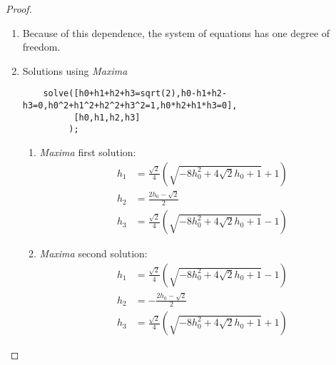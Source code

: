 \begin{proof}
\begin{enumerate}
\begin{enumerate}
\item Because of this dependence, the system of equations has one degree of freedom.

\item Solutions using {\em Maxima}\texttrademark \\
  \begin{verbatim}
    solve([h0+h1+h2+h3=sqrt(2),h0-h1+h2-h3=0,h0^2+h1^2+h2^2+h3^2=1,h0*h2+h1*h3=0],
          [h0,h1,h2,h3]
         );
  \end{verbatim}
\begin{enumerate}
\item {\em Maxima} first solution:
  \begin{align*}
    h_1 &= \frac{\sqrt{2}}{4}\left(\sqrt{-8h_0^2+4\sqrt{2}h_0+1}+1\right)
  \\h_2 &= \frac{2h_0-\sqrt{2}}{2}
  \\h_3 &= \frac{\sqrt{2}}{4}\left(\sqrt{-8h_0^2+4\sqrt{2}h_0+1}-1\right)
  \end{align*}

\item {\em Maxima} second solution:
  \begin{align*}
    h_1 &= \frac{\sqrt{2}}{4}\left(\sqrt{-8h_0^2+4\sqrt{2}h_0+1}-1\right)
  \\h_2 &= -\frac{2h_0-\sqrt{2}}{2}
  \\h_3 &= \frac{\sqrt{2}}{4}\left(\sqrt{-8h_0^2+4\sqrt{2}h_0+1}+1\right)
  \end{align*}
\end{enumerate}
\end{enumerate}
\end{enumerate}
\end{proof}

